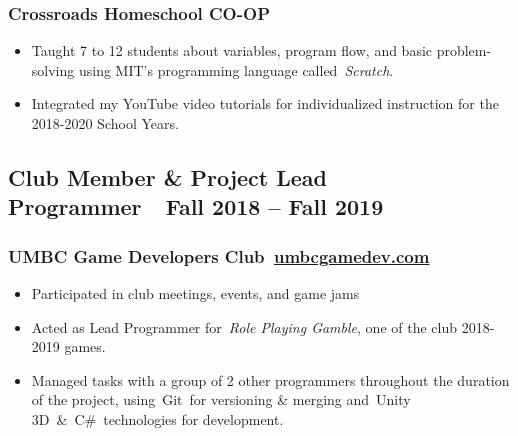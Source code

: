 \documentclass[letterpaper]{article}
\newcommand\textstyleHeadingivChar[1]{\textit{\textcolor[rgb]{0.6784314,0.30980393,0.05882353}{#1}}}
\newcommand\textstyleToolPrimaryChar[1]{\textcolor[rgb]{0.18039216,0.45490196,0.70980394}{#1}}
\newcommand\textstyleHyperlink[1]{\textcolor[rgb]{0.019607844,0.3882353,0.75686276}{#1}}
\newcommand\liststyleLFOi{%
\renewcommand\labelitemi{{}-}
\renewcommand\labelitemii{o}
\renewcommand\labelitemiii{${\blacksquare}$}
\renewcommand\labelitemiv{{\textbullet}}
}
\begin{document}
\subsubsection{Crossroads Homeschool CO-OP}
\liststyleLFOi
\begin{itemize}
\item Taught 7 to 12 students about variables, program flow, and basic problem-solving using MIT's programming language
called\ \textstyleHeadingivChar{Scratch}.
\item Integrated my YouTube video tutorials for individualized instruction for the 2018-2020 School Years.
\end{itemize}
\subsection[Club Member \& Project Lead Programmer\ \ Fall 2018 {}-- Fall 2019]{Club Member \& Project Lead
Programmer\ \ Fall 2018 -- Fall 2019}
\subsubsection[UMBC Game Developers Club\ umbcgamedev.com]{UMBC Game Developers
Club\ \href{https://umbcgamedev.com/}{\textstyleHyperlink{umbcgamedev.com}}}
\liststyleLFOi
\begin{itemize}
\item Participated in club meetings, events, and game jams
\item Acted as Lead Programmer for\ \textit{Role Playing Gamble}, one of the club 2018-2019 games.
\item Managed tasks with a group of 2 other programmers throughout the duration of the project,
using\ \textstyleToolPrimaryChar{Git}\ for versioning \& merging and\ \textstyleToolPrimaryChar{Unity
3D}\ \&\ \textstyleToolPrimaryChar{C\#}\ technologies for development.
\end{itemize}
\end{document}
